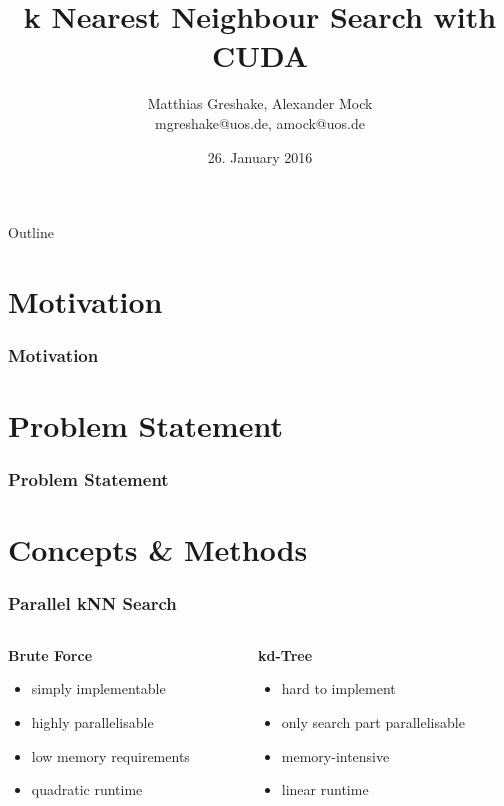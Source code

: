 \documentclass{beamer}
\begin{document}
\title{k Nearest Neighbour Search with CUDA}
\author[Matthias Greshake, Alexander Mock]{Matthias Greshake, Alexander Mock\\ {\scriptsize mgreshake@uos.de, amock@uos.de}}
\date{26. January 2016}

\begin{frame}[plain]
	\titlepage
\end{frame} 

\begin{frame}{Outline}
	\tableofcontents
\end{frame} 

\section{Motivation}

\begin{frame}
	\frametitle{Motivation}
\end{frame}

\section{Problem Statement}

\begin{frame}
	\frametitle{Problem Statement}
\end{frame}

\section{Concepts \& Methods}

\begin{frame}
	\frametitle{Parallel kNN Search}
	\begin{columns}[T]
		\begin{column}{0.5\textwidth}
			\textbf{Brute Force}
			\begin{itemize}
				\item simply implementable
				\item highly parallelisable
				\item low memory requirements
				\item quadratic runtime
			\end{itemize}
		\end{column}
		\begin{column}{0.5\textwidth}
			\textbf{kd-Tree}
			\begin{itemize}
				\item hard to implement
				\item only search part parallelisable
				\item memory-intensive
				\item linear runtime
			\end{itemize}
		\end{column}
	\end{columns}
\end{frame}
\end{document}
